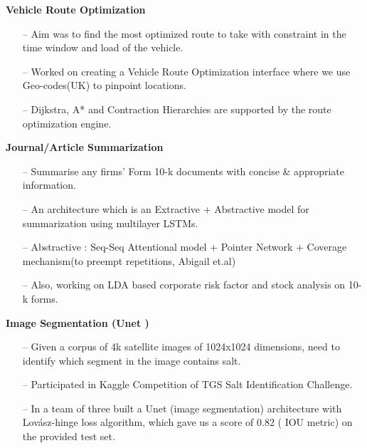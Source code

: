 \documentclass[margin,line]{templates/resume}
\newcommand{\myhref}[3][blue]{\href{#2}{\color{#1}{#3}}}
\newcommand{\compresslist}{%
\setlength{\itemsep}{3pt}%
\setlength{\parskip}{0pt}%
\setlength{\parsep}{0pt}%
}
\begin{document}
\begin{resume}
\begin{itemize}[leftmargin=*]
\end{itemize}

\vspace{-0.1cm}    
\textsf{\textbf{Vehicle Route Optimization}} \hfill{\myhref[darkblue]{https://esha-singh.github.io/\#mpi}{Web}}
\vspace{0.05cm}
\begin{itemize}[leftmargin=*]\compresslist
    \item[--]Aim was to find the most optimized route to take with constraint in the time window and load of the vehicle.
   \item[--] Worked on creating a Vehicle Route Optimization interface where we use Geo-codes(UK) to pinpoint locations. 
   \item[--]Dijkstra, A* and Contraction Hierarchies are supported by the route optimization engine.
\end{itemize}

\vspace{-0.2cm}
\textsf{\textbf{Journal/Article Summarization}} \hfill{\myhref[darkblue]{https://esha-singh.github.io/\#mpi}{Web}}
\vspace{0.05cm}
\begin{itemize}[leftmargin=*]\compresslist
 \item[--] Summarise any firms' Form 10-k documents with concise \& appropriate information. 
\item[--]An architecture which is an Extractive + Abstractive model for summarization using multilayer LSTMs.
\item[--]Abstractive : Seq-Seq Attentional model + Pointer Network + Coverage mechanism(to preempt repetitions, Abigail et.al) 
\item[--]Also, working on LDA based corporate risk factor and stock analysis on 10-k forms.
\end{itemize}

\vspace{-0.2cm}    
\textsf{\textbf{Image Segmentation (Unet )}} \hfill{\myhref[darkblue]{https://esha-singh.github.io/\#mpi}{Web}}
\vspace{0.05cm}
\begin{itemize}[leftmargin=*]\compresslist
 \item[--]Given a corpus of 4k satellite images of 1024x1024 dimensions, need to identify which segment in the image contains salt.  
\item[--] Participated in Kaggle Competition of TGS Salt Identification Challenge.
\item[--] In a team of three built a Unet (image segmentation) architecture with Lovász-hinge loss algorithm, which gave us a score of 0.82 ( IOU metric) on the provided test set.
\end{itemize}


\end{resume}
\end{document}
